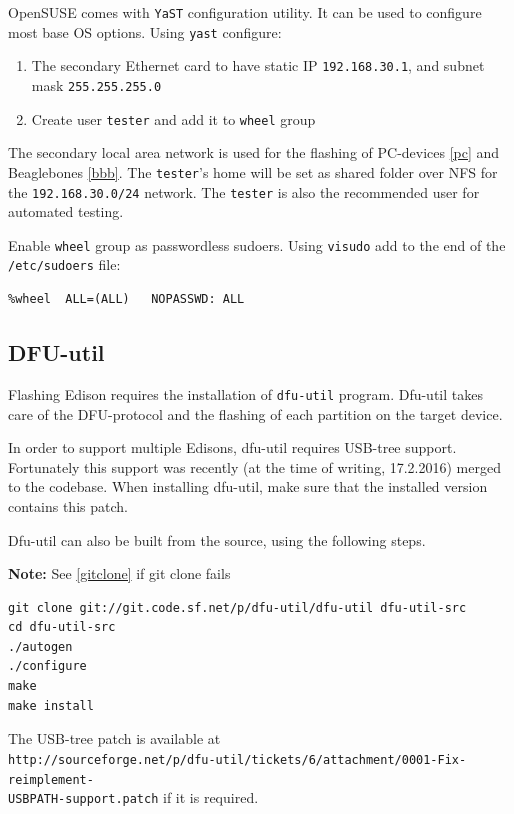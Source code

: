 \documentclass[a4paper,11pt]{article}
\newcommand{\note}{\textbf{Note: }}
\newcommand{\cmd}[1]{\texttt{#1}}
\begin{document}
OpenSUSE comes with \cmd{YaST} configuration utility. It can be used to configure most base OS options. Using \cmd{yast} configure:
\begin{enumerate}
\item The secondary Ethernet card to have static IP \cmd{192.168.30.1}, and subnet mask \cmd{255.255.255.0}
\item Create user \cmd{tester} and add it to \cmd{wheel} group
\end{enumerate}
The secondary local area network is used for the flashing of PC-devices  \ref{pc} and Beaglebones \ref{bbb}. The \cmd{tester}'s  home will be set as shared folder over NFS for the \cmd{192.168.30.0/24} network. The \cmd{tester} is also the recommended user for automated testing.

Enable \cmd{wheel} group as passwordless sudoers. Using \cmd{visudo} add to the end of the \cmd{/etc/sudoers} file:
\begin{lstlisting}
%wheel	ALL=(ALL)	NOPASSWD: ALL
\end{lstlisting}

\subsection*{DFU-util}
\label{dfuutil}

Flashing Edison requires the installation of \cmd{dfu-util} program. Dfu-util takes care of the DFU-protocol and the flashing of each partition on the target device.

In order to support multiple Edisons, dfu-util requires USB-tree support. Fortunately this support was recently (at the time of writing, 17.2.2016) merged to the codebase. When installing dfu-util, make sure that the installed version contains this patch. 

Dfu-util can also be built from the source, using the following steps.

\note See \ref{gitclone} if git clone fails

\begin{lstlisting}
git clone git://git.code.sf.net/p/dfu-util/dfu-util dfu-util-src
cd dfu-util-src
./autogen
./configure
make
make install
\end{lstlisting}

The USB-tree patch is available at \\ \cmd{http://sourceforge.net/p/dfu-util/tickets/6/attachment/0001-Fix-reimplement-\\USBPATH-support.patch} if it is required.
\end{document}
